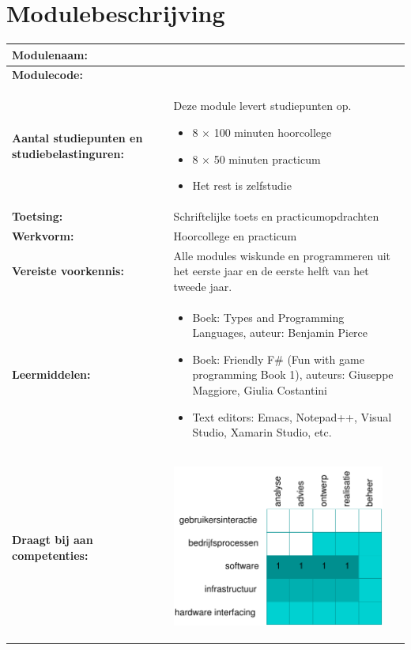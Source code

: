 \section*{Modulebeschrijving}
\begin{tabularx}{\textwidth}{|>{\columncolor{lichtGrijs}} p{}|X|}
	\hline
	\textbf{Modulenaam:} & \modulenaam\\
	\hline
	\textbf{Modulecode: }& \modulecode\\
	\hline
	\textbf{Aantal studiepunten \newline en studiebelastinguren:} & Deze module levert \stdPunten studiepunten op.
	\begin{itemize}
		\item 8 $\times$ 100 minuten hoorcollege
		\item 8 $\times$ 50 minuten practicum
		\item Het rest is zelfstudie
	\end{itemize} \\
	\hline
	\textbf{Toetsing:} & Schriftelijke toets en practicumopdrachten \\
	\hline
	\textbf{Werkvorm:} & Hoorcollege en practicum \\
	\hline
	\textbf{Vereiste voorkennis:}&Alle modules wiskunde en programmeren uit het eerste jaar en de eerste helft van het tweede jaar.\\
	\hline
	\textbf{Leermiddelen:}  &
		\begin{itemize}
			\item Boek: Types and Programming Languages, auteur: Benjamin Pierce
			\item Boek: Friendly F\# (Fun with game programming Book 1), auteurs: Giuseppe Maggiore, Giulia Costantini
			\item Text editors: Emacs, Notepad++, Visual Studio, Xamarin Studio, etc.
		\end{itemize} \\
	\hline
	\textbf{Draagt bij aan \newline competenties:} &
	\begin{center}
		\includegraphics[width=7cm]{img/comptabel.pdf}

\end{center}
\end{tabularx}
